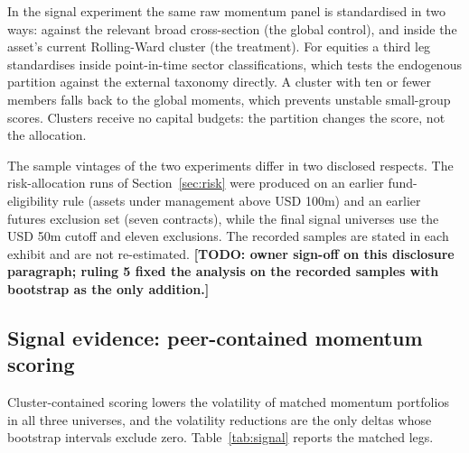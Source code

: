\documentclass{rQUF2e}
\theoremstyle{plain}
\theoremstyle{remark}
\newcommand{\TODO}[1]{\textbf{[TODO: #1]}}
\begin{document}
In the signal experiment the same raw momentum panel
\citep{jegadeesh1993returns} is standardised in two ways: against the relevant
broad cross-section (the global control), and inside the asset's current
Rolling-Ward cluster (the treatment). For equities
a third leg standardises inside point-in-time sector classifications, which
tests the endogenous partition against the external taxonomy directly. A
cluster with ten or fewer members falls back to the global moments, which
prevents unstable small-group scores. Clusters receive no capital budgets: the
partition changes the score, not the allocation.

The sample vintages of the two experiments differ in two disclosed respects.
The risk-allocation runs of Section~\ref{sec:risk} were produced on an earlier
fund-eligibility rule (assets under management above USD 100m) and an earlier
futures exclusion set (seven contracts), while the final signal universes use
the USD 50m cutoff and eleven exclusions. The recorded samples are stated in
each exhibit and are not re-estimated. \TODO{owner sign-off on this
disclosure paragraph; ruling 5 fixed the analysis on the recorded samples
with bootstrap as the only addition.}

\subsection{Signal evidence: peer-contained momentum scoring}
\label{sec:signal}

Cluster-contained scoring lowers the volatility of matched momentum
portfolios in all three universes, and the volatility reductions are the only
deltas whose bootstrap intervals exclude zero. Table~\ref{tab:signal} reports
the matched legs.
\end{document}
